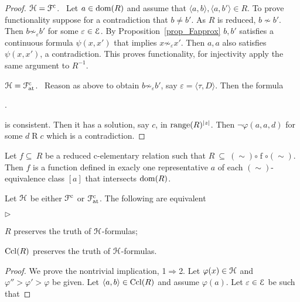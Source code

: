 \documentclass{amsproc}
\newcommand{\mylabel}[1]{{#1}\hfill}
\renewenvironment{itemize}
  {\begin{list}{$\triangleright$}{%
  \setlength{\parskip}{0mm}
  \setlength{\topsep}{.4\baselineskip}
  \setlength{\rightmargin}{0mm}
  \setlength{\listparindent}{0mm}
  \setlength{\itemindent}{0mm}
  \setlength{\labelwidth}{3ex}
  \setlength{\itemsep}{.2\baselineskip}
  \setlength{\parsep}{.2\baselineskip}
  \setlength{\partopsep}{0mm}
  \setlength{\labelsep}{1ex}
  \setlength{\leftmargin}{\labelwidth+\labelsep}
  \let\makelabel\mylabel}}{%
\end{list}}
\begin{document}
{\begin{proof}
  ${\EuScript H}={\EuScript F}^{\rm c}$. \ 
  Let $a\in{\rm dom}(R)$ and assume that $\langle a,b\rangle,\langle a,b'\rangle\in R$.
  To prove functionality suppose for a contradiction that $b\neq b'$.
  As $R$ is reduced, $b\not\sim b'$.
  Then $b\not\sim_\varepsilon b'$ for some $\varepsilon\in{\EuScript E}$.
  By Proposition~\ref{prop_Fapprox} $b,b'$ satisfies a continuous formula $\psi(x,x')$ that implies  $x\not\sim_\varepsilon x'$.
  Then $a,a$ also satisfies $\psi(x,x')$, a contradiction.
  This proves functionality, for injectivity apply the same argument to $R^{-1}$.

  ${\EuScript H}={\EuScript F}^{\rm c}_{\rm at}$. \ 
  Reason as above to obtain $b\not\sim_\varepsilon b'$, say $\varepsilon=\langle\tau,D\rangle$.
  Then the formula 
  
  .
  
  is consistent.
  Then it has a solution, say $c$, in ${\rm range}(R)^{|z|}$.
  Then $\neg\varphi(a,a,d)$ for some $d\mathrel{R} c$ which is a contradiction.
\end{proof}

Let $f \subseteq\ R$ be a reduced c-elementary relation such that $R\ \subseteq\ \mathrel{(\sim)}\circ \mathrel{f}\circ\mathrel{(\sim)}$.
Then $f$ is a function defined in exacly one representative $a$ of each $(\sim)$-equivalence class $[a]$ that intersects ${\rm dom}(R)$.

\begin{fact}\label{fact_Rcompletion}
  Let ${\EuScript H}$ be either ${\EuScript F}^{\rm c}$ or ${\EuScript F}^{\rm c}_{\rm at}$.
  The following are equivalent
  \begin{itemize}
    \item[1.] $R$ preserves the truth of ${\EuScript H}$-formulas;
    \item[2.] ${\rm Ccl}(R)$ preserves the truth of ${\EuScript H}$-formulas.
  \end{itemize}
\end{fact}

\begin{proof}
  We prove the nontrivial implication, 1$\Rightarrow$2.
  Let $\varphi(x)\in{\EuScript H}$ and $\varphi''>\varphi'>\varphi$ be given.
  Let $\langle a,b\rangle\in{\rm Ccl}(R)$ and assume $\varphi(a)$.
  Let $\varepsilon\in{\EuScript E}$ be such that 



\end{proof}}
\end{document}
